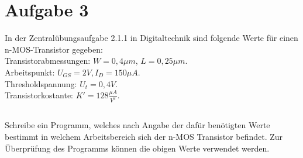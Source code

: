 \documentclass{standalone}
\begin{document}
\section{Aufgabe 3}
In der Zentralübungsaufgabe 2.1.1 in Digitaltechnik sind folgende Werte für einen 
n-MOS-Transistor gegeben: \\
Transistorabmessungen: $W = 0,4\mu m$, $L = 0,25\mu m$.\\
Arbeitspunkt: $U_{GS} = 2V, I_D = 150\mu A$.\\
Thresholdspannung: $U_t = 0,4V$.\\
Transistorkostante: $K' = 128 \frac{\mu A}{V^2}$.

\subsection{}
Schreibe ein Programm, welches nach Angabe der dafür benötigten Werte bestimmt 
in welchem Arbeitsbereich sich der n-MOS Transistor befindet. 
Zur Überprüfung des Programms können die obigen Werte verwendet werden.
\end{document}

